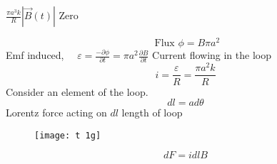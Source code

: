 \begin{questions}
\begin{tasks}
	\task[\textbf{B.}]   $\frac{\pi a^{3} k}{R}|\vec{B}(t)|$
	\task[\textbf{C.}] 
	\task[\textbf{D.}]   Zero
\end{tasks}
\begin{answer}
	$$
	\text { Flux } \phi=B \pi a^{2}
	$$
	Emf induced, $\quad \varepsilon=\frac{-\partial \phi}{\partial t}=\pi a^{2} \frac{\partial B}{\partial t}$
	Current flowing in the loop
	$$
	i=\frac{\varepsilon}{R}=\frac{\pi a^{2} k}{R}
	$$
	Consider an element of the loop. \\
	$$
	d l=a d \theta
	$$
	Lorentz force acting on $d l$ length of loop
	\begin{figure}[H]
		\centering
		\texttt{[image: t 1g]}
		
	\end{figure}
	$$
	d F=i d l B
	$$
	

\end{answer}
\end{questions}
